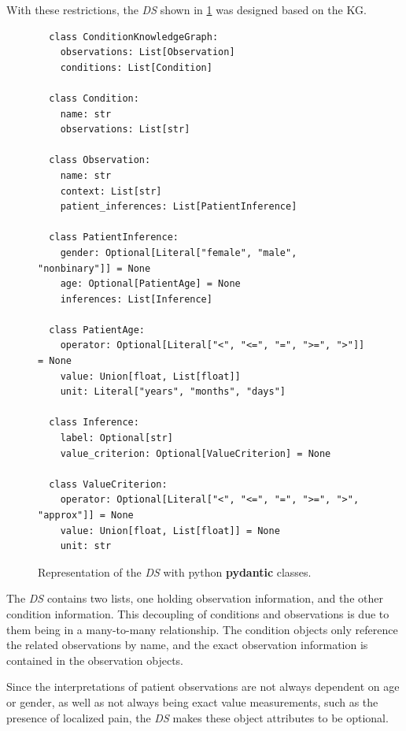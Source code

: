 \documentclass[bs, english]{stthesis}
\begin{document}
With these restrictions, the \textit{DS} shown in \cref{fig:DataStructure} was designed based on the KG.

\begin{figure}[]
  \begin{verbatim}
  class ConditionKnowledgeGraph:
    observations: List[Observation]
    conditions: List[Condition]

  class Condition:
    name: str
    observations: List[str]

  class Observation:
    name: str
    context: List[str]
    patient_inferences: List[PatientInference]

  class PatientInference:
    gender: Optional[Literal["female", "male", "nonbinary"]] = None
    age: Optional[PatientAge] = None
    inferences: List[Inference]

  class PatientAge:
    operator: Optional[Literal["<", "<=", "=", ">=", ">"]] = None
    value: Union[float, List[float]]
    unit: Literal["years", "months", "days"]

  class Inference:
    label: Optional[str]
    value_criterion: Optional[ValueCriterion] = None

  class ValueCriterion:
    operator: Optional[Literal["<", "<=", "=", ">=", ">", "approx"]] = None
    value: Union[float, List[float]] = None
    unit: str
  \end{verbatim}
  \caption{Representation of the \textit{DS} with python \textbf{pydantic} classes.}
  \label{fig:DataStructure}
\end{figure}

The \textit{DS} contains two lists, one holding observation information, and the other condition information. This decoupling of conditions and observations is due to them being in a many-to-many relationship. The condition objects only reference the related observations by name, and the exact observation information is contained in the observation objects.

Since the interpretations of patient observations are not always dependent on age or gender, as well as not always being exact value measurements, such as the presence of localized pain, the \textit{DS} makes these object attributes to be optional.
\end{document}
